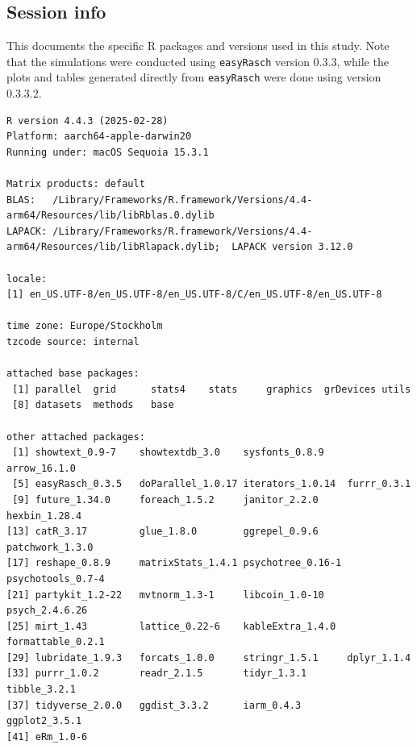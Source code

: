 \documentclass[
  letterpaper,
  DIV=11,
  numbers=noendperiod]{scrartcl}
\begin{document}
\begin{longtable}[]{@{}lrrrr@{}}
\end{longtable}

\subsection{Session info}\label{session-info}

This documents the specific R packages and versions used in this study.
Note that the simulations were conducted using \texttt{easyRasch}
version 0.3.3, while the plots and tables generated directly from
\texttt{easyRasch} were done using version 0.3.3.2.

\begin{verbatim}
R version 4.4.3 (2025-02-28)
Platform: aarch64-apple-darwin20
Running under: macOS Sequoia 15.3.1

Matrix products: default
BLAS:   /Library/Frameworks/R.framework/Versions/4.4-arm64/Resources/lib/libRblas.0.dylib 
LAPACK: /Library/Frameworks/R.framework/Versions/4.4-arm64/Resources/lib/libRlapack.dylib;  LAPACK version 3.12.0

locale:
[1] en_US.UTF-8/en_US.UTF-8/en_US.UTF-8/C/en_US.UTF-8/en_US.UTF-8

time zone: Europe/Stockholm
tzcode source: internal

attached base packages:
 [1] parallel  grid      stats4    stats     graphics  grDevices utils    
 [8] datasets  methods   base     

other attached packages:
 [1] showtext_0.9-7    showtextdb_3.0    sysfonts_0.8.9    arrow_16.1.0     
 [5] easyRasch_0.3.5   doParallel_1.0.17 iterators_1.0.14  furrr_0.3.1      
 [9] future_1.34.0     foreach_1.5.2     janitor_2.2.0     hexbin_1.28.4    
[13] catR_3.17         glue_1.8.0        ggrepel_0.9.6     patchwork_1.3.0  
[17] reshape_0.8.9     matrixStats_1.4.1 psychotree_0.16-1 psychotools_0.7-4
[21] partykit_1.2-22   mvtnorm_1.3-1     libcoin_1.0-10    psych_2.4.6.26   
[25] mirt_1.43         lattice_0.22-6    kableExtra_1.4.0  formattable_0.2.1
[29] lubridate_1.9.3   forcats_1.0.0     stringr_1.5.1     dplyr_1.1.4      
[33] purrr_1.0.2       readr_2.1.5       tidyr_1.3.1       tibble_3.2.1     
[37] tidyverse_2.0.0   ggdist_3.3.2      iarm_0.4.3        ggplot2_3.5.1    
[41] eRm_1.0-6        


\end{verbatim}
\end{document}
